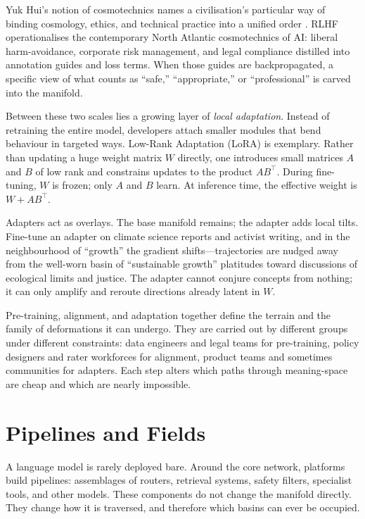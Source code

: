 \documentclass[12pt,a4paper]{article}
\begin{document}
Yuk Hui's notion of cosmotechnics names a civilisation's particular way of binding cosmology, ethics, and technical practice into a unified order \cite{hui2016question,hui2020cosmotechnics}. RLHF operationalises the contemporary North Atlantic cosmotechnics of AI: liberal harm-avoidance, corporate risk management, and legal compliance distilled into annotation guides and loss terms. When those guides are backpropagated, a specific view of what counts as ``safe,'' ``appropriate,'' or ``professional'' is carved into the manifold.

Between these two scales lies a growing layer of \emph{local adaptation}. Instead of retraining the entire model, developers attach smaller modules that bend behaviour in targeted ways. Low-Rank Adaptation (LoRA) is exemplary. Rather than updating a huge weight matrix $W$ directly, one introduces small matrices $A$ and $B$ of low rank and constrains updates to the product $AB^\top$. During fine-tuning, $W$ is frozen; only $A$ and $B$ learn. At inference time, the effective weight is $W + AB^\top$.

Adapters act as overlays. The base manifold remains; the adapter adds local tilts. Fine-tune an adapter on climate science reports and activist writing, and in the neighbourhood of ``growth'' the gradient shifts---trajectories are nudged away from the well-worn basin of ``sustainable growth'' platitudes toward discussions of ecological limits and justice. The adapter cannot conjure concepts from nothing; it can only amplify and reroute directions already latent in $W$.

Pre-training, alignment, and adaptation together define the terrain and the family of deformations it can undergo. They are carried out by different groups under different constraints: data engineers and legal teams for pre-training, policy designers and rater workforces for alignment, product teams and sometimes communities for adapters. Each step alters which paths through meaning-space are cheap and which are nearly impossible.

\section{Pipelines and Fields}

A language model is rarely deployed bare. Around the core network, platforms build pipelines: assemblages of routers, retrieval systems, safety filters, specialist tools, and other models. These components do not change the manifold directly. They change how it is traversed, and therefore which basins can ever be occupied.
\end{document}
